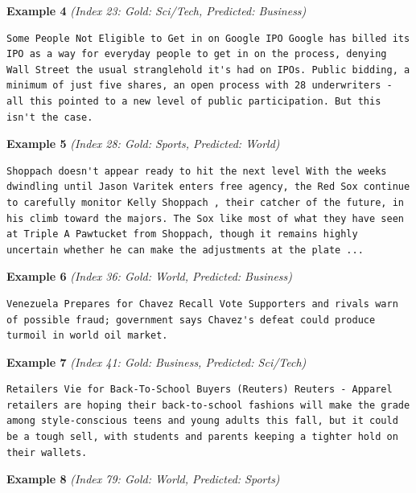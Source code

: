 \noindent
\textbf{Example 4} \quad \textit{(Index 23: Gold: Sci/Tech, Predicted: Business)}

\begin{Verbatim}[breaklines=true,breakanywhere=true,fontsize=\small]
Some People Not Eligible to Get in on Google IPO Google has billed its IPO as a way for everyday people to get in on the process, denying Wall Street the usual stranglehold it's had on IPOs. Public bidding, a minimum of just five shares, an open process with 28 underwriters - all this pointed to a new level of public participation. But this isn't the case.
\end{Verbatim}

\noindent
\textbf{Example 5} \quad \textit{(Index 28: Gold: Sports, Predicted: World)}

\begin{Verbatim}[breaklines=true,breakanywhere=true,fontsize=\small]
Shoppach doesn't appear ready to hit the next level With the weeks dwindling until Jason Varitek enters free agency, the Red Sox continue to carefully monitor Kelly Shoppach , their catcher of the future, in his climb toward the majors. The Sox like most of what they have seen at Triple A Pawtucket from Shoppach, though it remains highly uncertain whether he can make the adjustments at the plate ...
\end{Verbatim}

\noindent
\textbf{Example 6} \quad \textit{(Index 36: Gold: World, Predicted: Business)}

\begin{Verbatim}[breaklines=true,breakanywhere=true,fontsize=\small]
Venezuela Prepares for Chavez Recall Vote Supporters and rivals warn of possible fraud; government says Chavez's defeat could produce turmoil in world oil market.
\end{Verbatim}

\noindent
\textbf{Example 7} \quad \textit{(Index 41: Gold: Business, Predicted: Sci/Tech)}

\begin{Verbatim}[breaklines=true,breakanywhere=true,fontsize=\small]
Retailers Vie for Back-To-School Buyers (Reuters) Reuters - Apparel retailers are hoping their back-to-school fashions will make the grade among style-conscious teens and young adults this fall, but it could be a tough sell, with students and parents keeping a tighter hold on their wallets.
\end{Verbatim}

\noindent
\textbf{Example 8} \quad \textit{(Index 79: Gold: World, Predicted: Sports)}

